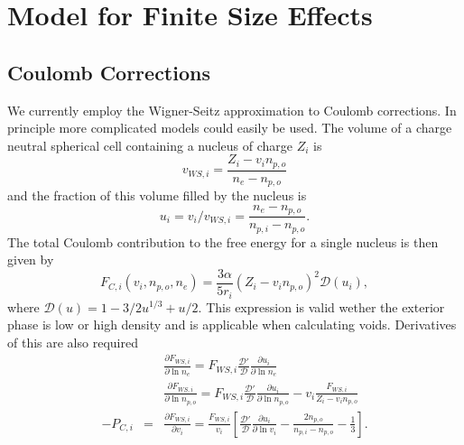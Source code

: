 \documentclass[11pt,letter]{article}
\newcommand{\pd}[2]{\frac{\partial #1}{\partial #2}}
\begin{document}
\section{Model for Finite Size Effects}
\subsection{Coulomb Corrections} 
We currently employ the Wigner-Seitz approximation to Coulomb corrections.  In
principle more complicated models could easily be used.  The volume of a charge
neutral spherical cell containing a nucleus of charge $Z_i$ is 
\begin{equation} 
v_{WS,i} = \frac{Z_i - v_i n_{p,o}}{n_e - n_{p,o}}
\end{equation}
and the fraction of this volume filled by the nucleus is 
\begin{equation}
u_i = v_i/v_{WS,i} = \frac{n_e - n_{p,o}}{n_{p,i} - n_{p,o}}. 
\end{equation} 
The total Coulomb contribution to the free energy for a single nucleus is then
given by
\begin{equation}
F_{C,i}(v_i, n_{p,o}, n_e) = \frac{3\alpha}{5 r_i} \left(Z_i - v_i n_{p,o}\right)^2 
\mathcal{D}(u_i),
\end{equation} 
where $\mathcal{D}(u) = 1 - 3/2 u^{1/3} + u/2$.  This expression is valid wether
the exterior phase is low or high density and is applicable when calculating
voids.  Derivatives of this are also required 
\begin{eqnarray}
&& \pd{F_{WS,i}}{\ln n_e} = F_{WS,i} \frac{\mathcal{D}'}{\mathcal{D}}
\pd{u_i}{\ln n_e} \\
&& \pd{F_{WS,i}}{\ln n_{p,o}} = F_{WS,i} \frac{\mathcal{D}'}{\mathcal{D}}
\pd{u_i}{\ln n_{p,o}} - v_i \frac{F_{WS,i}}{Z_i - v_i n_{p,o}}\\
-P_{C,i} &=&  \pd{F_{WS,i}}{v_i} = \frac{F_{WS,i}}{v_i} 
\left[ \frac{\mathcal{D}'}{\mathcal{D}}  \pd{u_i}{\ln v_i} 
- \frac{2n_{p,o}}{n_{p,i} - n_{p,o}} - \frac{1}{3} \right].
\end{eqnarray}
  
\end{document}
